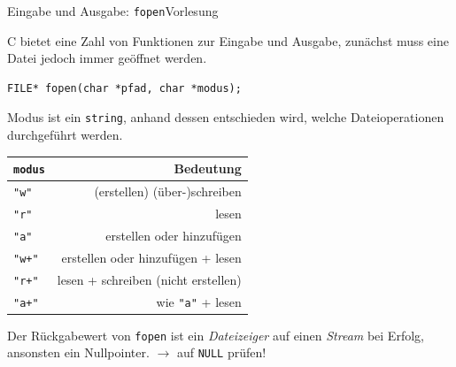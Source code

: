 \documentclass[xcolor=dvipsnames]{beamer}
\newcounter{lecturecounter}
\begin{document}
\begin{frame}[fragile]{Eingabe und Ausgabe: \texttt{fopen}}{Vorlesung }
  \begin{block}{}
    C bietet eine Zahl von Funktionen zur Eingabe und Ausgabe, zunächst muss eine Datei jedoch immer geöffnet werden.
  \end{block}
\begin{lstlisting}
FILE* fopen(char *pfad, char *modus);   
\end{lstlisting}
\begin{block}{}
Modus ist ein \texttt{string}, anhand dessen entschieden wird, welche Dateioperationen durchgeführt werden.
\end{block}
\centering
\small
  \begin{tabular}{lr}
    \hline
    \texttt{modus}  & Bedeutung                           \\\hline
    \verb|"w"|      & (erstellen) (über-)schreiben        \\
    \verb|"r"|      & lesen                               \\
    \verb|"a"|      & erstellen oder hinzufügen           \\
    \verb|"w+"|     & erstellen oder hinzufügen + lesen   \\
    \verb|"r+"|     & lesen + schreiben (nicht erstellen) \\
    \verb|"a+"|     & wie \verb|"a"| + lesen              \\
    \hline
  \end{tabular}
\begin{block}{}
  Der Rückgabewert von \texttt{fopen} ist ein \emph{Dateizeiger} auf einen \emph{Stream} bei Erfolg, ansonsten ein Nullpointer. $\rightarrow$ auf \texttt{NULL} prüfen!
\end{block}

\end{frame}
\end{document}
